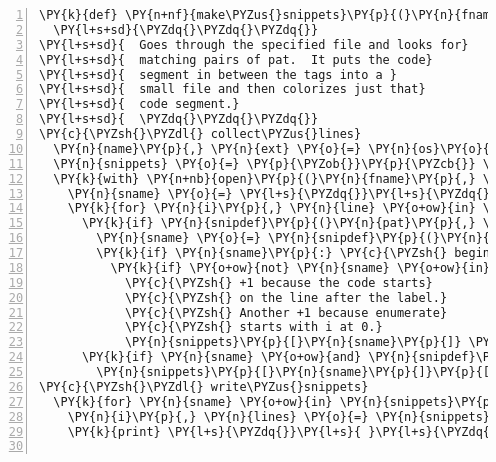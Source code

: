 \begin{Verbatim}[commandchars=\\\{\},numbers=left,numbersep=0.5em]
\PY{k}{def} \PY{n+nf}{make\PYZus{}snippets}\PY{p}{(}\PY{n}{fname}\PY{p}{,} \PY{n}{outdir}\PY{p}{,} \PY{n}{pat}\PY{o}{=}\PY{l+s}{\PYZdq{}}\PY{l+s}{\PYZpc{}}\PY{l+s}{!}\PY{l+s}{\PYZdq{}}\PY{p}{)}\PY{p}{:}
  \PY{l+s+sd}{\PYZdq{}\PYZdq{}\PYZdq{}}
\PY{l+s+sd}{  Goes through the specified file and looks for}
\PY{l+s+sd}{  matching pairs of pat.  It puts the code}
\PY{l+s+sd}{  segment in between the tags into a }
\PY{l+s+sd}{  small file and then colorizes just that}
\PY{l+s+sd}{  code segment.}
\PY{l+s+sd}{  \PYZdq{}\PYZdq{}\PYZdq{}}
\PY{c}{\PYZsh{}\PYZdl{} collect\PYZus{}lines}
  \PY{n}{name}\PY{p}{,} \PY{n}{ext} \PY{o}{=} \PY{n}{os}\PY{o}{.}\PY{n}{path}\PY{o}{.}\PY{n}{splitext}\PY{p}{(}\PY{n}{fname}\PY{p}{)}
  \PY{n}{snippets} \PY{o}{=} \PY{p}{\PYZob{}}\PY{p}{\PYZcb{}} \PY{c}{\PYZsh{} dict of this file\PYZsq{}s snippets}
  \PY{k}{with} \PY{n+nb}{open}\PY{p}{(}\PY{n}{fname}\PY{p}{,} \PY{l+s}{\PYZdq{}}\PY{l+s}{r}\PY{l+s}{\PYZdq{}}\PY{p}{)} \PY{k}{as} \PY{n}{fin}\PY{p}{:}
    \PY{n}{sname} \PY{o}{=} \PY{l+s}{\PYZdq{}}\PY{l+s}{\PYZdq{}} \PY{c}{\PYZsh{} sname will be the name of snippet}
    \PY{k}{for} \PY{n}{i}\PY{p}{,} \PY{n}{line} \PY{o+ow}{in} \PY{n+nb}{enumerate}\PY{p}{(}\PY{n}{fin}\PY{o}{.}\PY{n}{readlines}\PY{p}{(}\PY{p}{)}\PY{p}{)}\PY{p}{:}
      \PY{k}{if} \PY{n}{snipdef}\PY{p}{(}\PY{n}{pat}\PY{p}{,} \PY{n}{line}\PY{p}{)} \PY{o+ow}{is} \PY{o+ow}{not} \PY{n+nb+bp}{None}\PY{p}{:}
        \PY{n}{sname} \PY{o}{=} \PY{n}{snipdef}\PY{p}{(}\PY{n}{pat}\PY{p}{,} \PY{n}{line}\PY{p}{)}     
        \PY{k}{if} \PY{n}{sname}\PY{p}{:} \PY{c}{\PYZsh{} beginning of a snippet}
          \PY{k}{if} \PY{o+ow}{not} \PY{n}{sname} \PY{o+ow}{in} \PY{n}{snippets}\PY{p}{:}
            \PY{c}{\PYZsh{} +1 because the code starts}
            \PY{c}{\PYZsh{} on the line after the label.}
            \PY{c}{\PYZsh{} Another +1 because enumerate}
            \PY{c}{\PYZsh{} starts with i at 0.}
            \PY{n}{snippets}\PY{p}{[}\PY{n}{sname}\PY{p}{]} \PY{o}{=} \PY{p}{(}\PY{n}{i}\PY{o}{+}\PY{l+m+mi}{2}\PY{p}{,} \PY{p}{[}\PY{p}{]}\PY{p}{)}
      \PY{k}{if} \PY{n}{sname} \PY{o+ow}{and} \PY{n}{snipdef}\PY{p}{(}\PY{n}{pat}\PY{p}{,} \PY{n}{line}\PY{p}{)} \PY{o+ow}{is} \PY{n+nb+bp}{None}\PY{p}{:}
        \PY{n}{snippets}\PY{p}{[}\PY{n}{sname}\PY{p}{]}\PY{p}{[}\PY{l+m+mi}{1}\PY{p}{]}\PY{o}{.}\PY{n}{append}\PY{p}{(}\PY{n}{line}\PY{p}{)}
\PY{c}{\PYZsh{}\PYZdl{} write\PYZus{}snippets}
  \PY{k}{for} \PY{n}{sname} \PY{o+ow}{in} \PY{n}{snippets}\PY{p}{:}
    \PY{n}{i}\PY{p}{,} \PY{n}{lines} \PY{o}{=} \PY{n}{snippets}\PY{p}{[}\PY{n}{sname}\PY{p}{]}
    \PY{k}{print} \PY{l+s}{\PYZdq{}}\PY{l+s}{ }\PY{l+s}{\PYZdq{}}\PY{p}{,} \PY{n}{sname}\PY{p}{,} \PY{n}{i}\PY{p}{,} \PY{l+s}{\PYZdq{}}\PY{l+s}{\PYZhy{}}\PY{l+s}{\PYZdq{}}\PY{p}{,} \PY{n}{i}\PY{o}{+}\PY{n+nb}{len}\PY{p}{(}\PY{n}{lines}\PY{p}{)}\PY{o}{\PYZhy{}}\PY{l+m+mi}{1}
    

\end{Verbatim}
